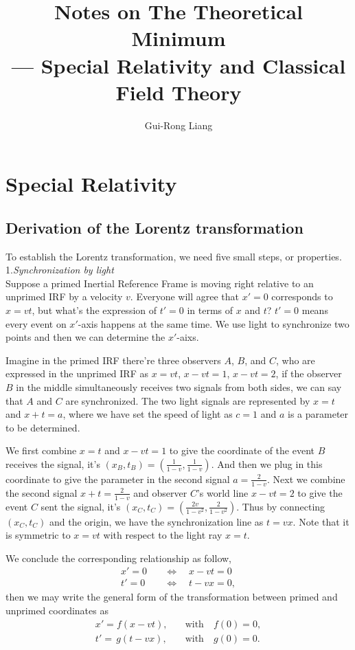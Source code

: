 \documentclass{article}
\title{Notes on The Theoretical Minimum\\
--- Special Relativity and Classical Field Theory}
\author{Gui-Rong Liang}
\newcommand{\be}{\begin{equation}}
\newcommand{\ee}{\end{equation}}
\newcommand{\bs}{\be\begin{split}}
\newcommand{\1}{\left}
\newcommand{\2}{\right}
\begin{document}
\maketitle
\tableofcontents

\newpage

\section{Special Relativity}
\subsection{Derivation of the Lorentz transformation}

To establish the Lorentz transformation, we need five small steps, or properties.\\

1.\textsl{Synchronization by light}\\

Suppose a primed Inertial Reference Frame is moving right relative to an unprimed IRF by a velocity $v$. Everyone will agree that $x'=0$ corresponds to $x=vt$, but what's the expression of $t'=0$ in terms of $x$ and $t$? $t'=0$ means every event on $x'$-axis happens at the same time. We use light to synchronize two points and then we can determine the $x'$-aixs.

Imagine in the primed IRF there're three observers $A$, $B$, and $C$, who are expressed in the unprimed IRF as $x=vt$, $x-vt=1$, $x-vt=2$, if the observer $B$ in the middle simultaneously receives two signals from both sides, we can say that $A$ and $C$ are synchronized. The two light signals are represented by $x=t$ and $x+t=a$, where we have set the speed of light as $c=1$ and $a$ is a parameter to be determined.

We first combine $x=t$ and $x-vt=1$ to give the coordinate of the event $B$ receives the signal, it's $(x_B, t_B)=(\frac1{1-v},\frac1{1-v})$. And then we plug in this coordinate to give the parameter in the second signal $a=\frac2{1-v}$. Next we combine the second signal $x+t=\frac2{1-v}$ and observer $C$'s world line $x-vt=2$ to give the event $C$ sent the signal, it's $(x_C, t_C)= (\frac{2v}{1-v^2}, \frac{2}{1-v^2})$. Thus by connecting $(x_C, t_C)$ and the origin,  we have the synchronization line as $t=vx$. Note that it is symmetric to $x=vt$ with respect to the light ray $x=t$.

We conclude the corresponding relationship as follow,
\be\begin{split}
x'=0 &\quad\Longleftrightarrow\quad x-vt=0\\
t'=0 &\quad\Longleftrightarrow\quad t-vx=0,
\end{split}\ee
then we may write the general form of the transformation between primed and unprimed coordinates as
\bs
x'=f(x-vt), &\quad\text{with}\quad f(0)=0,\\
t'=\,g(t-vx), &\quad\text{with}\quad g(0)=0.
\end{split}\ee
\end{document}
